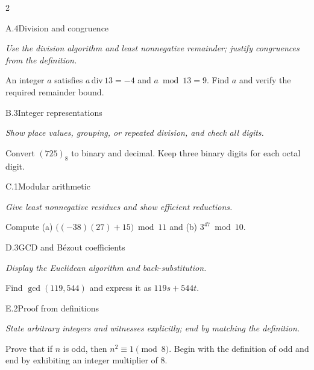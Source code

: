 \documentclass[9pt]{extarticle}
\begin{document}
\begin{multicols}{2}
\begin{CoreProblem}{A.4}{Division and congruence}
{\scriptsize\textit{Use the division algorithm and least nonnegative remainder; justify congruences from the definition.}\par}
An integer $a$ satisfies $a\,\mathrm{div}\,13=-4$ and $a\bmod13=9$.
Find $a$ and verify the required remainder bound.
\end{CoreProblem}
\begin{CoreProblem}{B.3}{Integer representations}
{\scriptsize\textit{Show place values, grouping, or repeated division, and check all digits.}\par}
Convert $(725)_8$ to binary and decimal. Keep three binary digits for each
octal digit.
\end{CoreProblem}
\begin{CoreProblem}{C.1}{Modular arithmetic}
{\scriptsize\textit{Give least nonnegative residues and show efficient reductions.}\par}
Compute (a) $\bigl((-38)(27)+15\bigr)\bmod11$ and
(b) $3^{47}\bmod10$.
\end{CoreProblem}
\columnbreak
\begin{CoreProblem}{D.3}{GCD and B\'ezout coefficients}
{\scriptsize\textit{Display the Euclidean algorithm and back-substitution.}\par}
Find $\gcd(119,544)$ and express it as $119s+544t$.
\end{CoreProblem}
\begin{CoreProblem}{E.2}{Proof from definitions}
{\scriptsize\textit{State arbitrary integers and witnesses explicitly; end by matching the definition.}\par}
Prove that if $n$ is odd, then $n^2\equiv1\pmod{8}$. Begin with the definition
of odd and end by exhibiting an integer multiplier of $8$.
\end{CoreProblem}
\end{multicols}
\CoreWorkArea
\FormBreak
{}
\end{document}
